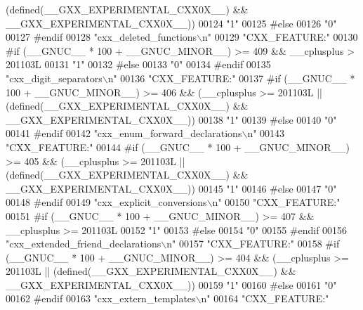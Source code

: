 \begin{DoxyCode}
{       (defined(\_\_GXX\_EXPERIMENTAL\_CXX0X\_\_) && \_\_GXX\_EXPERIMENTAL\_CXX0X\_\_))}
00124 \textcolor{stringliteral}{"1"}
00125 \textcolor{preprocessor}{#else}
00126 \textcolor{stringliteral}{"0"}
00127 \textcolor{preprocessor}{#endif}
00128 \textcolor{stringliteral}{"cxx\_deleted\_functions\(\backslash\)n"}
00129 \textcolor{stringliteral}{"CXX\_FEATURE:"}
00130 \textcolor{preprocessor}{#if (\_\_GNUC\_\_ * 100 + \_\_GNUC\_MINOR\_\_) >= 409 && \_\_cplusplus > 201103L}
00131 \textcolor{stringliteral}{"1"}
00132 \textcolor{preprocessor}{#else}
00133 \textcolor{stringliteral}{"0"}
00134 \textcolor{preprocessor}{#endif}
00135 \textcolor{stringliteral}{"cxx\_digit\_separators\(\backslash\)n"}
00136 \textcolor{stringliteral}{"CXX\_FEATURE:"}
00137 \textcolor{preprocessor}{#if (\_\_GNUC\_\_ * 100 + \_\_GNUC\_MINOR\_\_) >= 406 && (\_\_cplusplus >= 201103L ||
       (defined(\_\_GXX\_EXPERIMENTAL\_CXX0X\_\_) && \_\_GXX\_EXPERIMENTAL\_CXX0X\_\_))}
00138 \textcolor{stringliteral}{"1"}
00139 \textcolor{preprocessor}{#else}
00140 \textcolor{stringliteral}{"0"}
00141 \textcolor{preprocessor}{#endif}
00142 \textcolor{stringliteral}{"cxx\_enum\_forward\_declarations\(\backslash\)n"}
00143 \textcolor{stringliteral}{"CXX\_FEATURE:"}
00144 \textcolor{preprocessor}{#if (\_\_GNUC\_\_ * 100 + \_\_GNUC\_MINOR\_\_) >= 405 && (\_\_cplusplus >= 201103L ||
       (defined(\_\_GXX\_EXPERIMENTAL\_CXX0X\_\_) && \_\_GXX\_EXPERIMENTAL\_CXX0X\_\_))}
00145 \textcolor{stringliteral}{"1"}
00146 \textcolor{preprocessor}{#else}
00147 \textcolor{stringliteral}{"0"}
00148 \textcolor{preprocessor}{#endif}
00149 \textcolor{stringliteral}{"cxx\_explicit\_conversions\(\backslash\)n"}
00150 \textcolor{stringliteral}{"CXX\_FEATURE:"}
00151 \textcolor{preprocessor}{#if (\_\_GNUC\_\_ * 100 + \_\_GNUC\_MINOR\_\_) >= 407 && \_\_cplusplus >= 201103L}
00152 \textcolor{stringliteral}{"1"}
00153 \textcolor{preprocessor}{#else}
00154 \textcolor{stringliteral}{"0"}
00155 \textcolor{preprocessor}{#endif}
00156 \textcolor{stringliteral}{"cxx\_extended\_friend\_declarations\(\backslash\)n"}
00157 \textcolor{stringliteral}{"CXX\_FEATURE:"}
00158 \textcolor{preprocessor}{#if (\_\_GNUC\_\_ * 100 + \_\_GNUC\_MINOR\_\_) >= 404 && (\_\_cplusplus >= 201103L ||
       (defined(\_\_GXX\_EXPERIMENTAL\_CXX0X\_\_) && \_\_GXX\_EXPERIMENTAL\_CXX0X\_\_))}
00159 \textcolor{stringliteral}{"1"}
00160 \textcolor{preprocessor}{#else}
00161 \textcolor{stringliteral}{"0"}
00162 \textcolor{preprocessor}{#endif}
00163 \textcolor{stringliteral}{"cxx\_extern\_templates\(\backslash\)n"}
00164 \textcolor{stringliteral}{"CXX\_FEATURE:"}

\end{DoxyCode}
